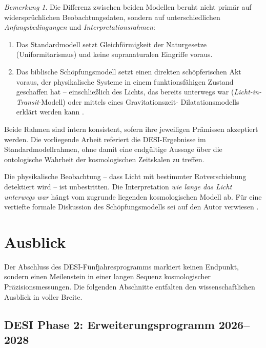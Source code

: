 ﻿\documentclass[a4paper,12pt]{article}
\theoremstyle{definition}
\theoremstyle{remark}
\newtheorem{bemerkung}{Bemerkung}[section]
\begin{document}
\begin{bemerkung}
  Die Differenz zwischen beiden Modellen beruht nicht primär auf
  widersprüchlichen Beobachtungsdaten, sondern auf unterschiedlichen
  \textit{Anfangsbedingungen} und \textit{Interpretationsrahmen}:
  \begin{enumerate}[label=\arabic*.]
    \item Das Standardmodell setzt Gleichförmigkeit der Naturgesetze (Uniformitarismus)
      und keine supranaturalen Eingriffe voraus.
    \item Das biblische Schöpfungsmodell setzt einen direkten schöpferischen Akt
      voraus, der physikalische Systeme in einem funktionsfähigen Zustand
      geschaffen hat -- einschließlich des Lichts, das bereits unterwegs war
      (\textit{Licht-in-Transit}-Modell) oder mittels eines Gravitationszeit-
      Dilatationsmodells erklärt werden kann \cite{humphreys1994}.
  \end{enumerate}
  Beide Rahmen sind intern konsistent, sofern ihre jeweiligen Prämissen
  akzeptiert werden. Die vorliegende Arbeit referiert die DESI-Ergebnisse im
  Standardmodellrahmen, ohne damit eine endgültige Aussage über die ontologische
  Wahrheit der kosmologischen Zeitskalen zu treffen.
\end{bemerkung}

Die physikalische Beobachtung -- dass Licht mit bestimmter Rotverschiebung
detektiert wird -- ist unbestritten. Die Interpretation \textit{wie lange das
Licht unterwegs war} hängt vom zugrunde liegenden kosmologischen Modell ab.
Für eine vertiefte formale Diskussion des Schöpfungsmodells sei auf den
Autor verwiesen \cite{eppgenesis2026}.

\section{Ausblick}
\label{sec:ausblick}

Der Abschluss des DESI-Fünfjahresprogramms markiert keinen Endpunkt, sondern
einen Meilenstein in einer langen Sequenz kosmologischer Präzisionsmessungen.
Die folgenden Abschnitte entfalten den wissenschaftlichen Ausblick in voller
Breite.

\subsection{DESI Phase 2: Erweiterungsprogramm 2026--2028}
\end{document}
